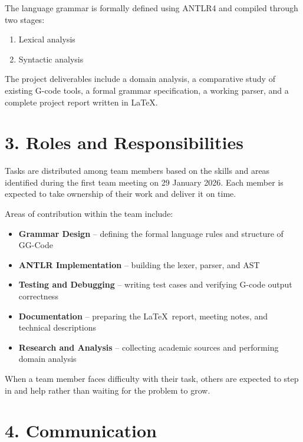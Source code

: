 \documentclass[12pt, a4paper]{article}
\begin{document}
The language grammar is formally defined using ANTLR4 and compiled through two stages:

\begin{enumerate}[leftmargin=2em]
    \item Lexical analysis
    \item Syntactic analysis
\end{enumerate}

The project deliverables include a domain analysis, a comparative study of existing G-code tools,
a formal grammar specification, a working parser, and a complete project report written in \LaTeX.

\section{3. Roles and Responsibilities}

Tasks are distributed among team members based on the skills and areas identified during the
first team meeting on 29 January 2026. Each member is expected to take ownership of their work
and deliver it on time.

Areas of contribution within the team include:

\begin{itemize}[leftmargin=2em, label={--}]
    \item \textbf{Grammar Design} -- defining the formal language rules and structure of GG-Code
    \item \textbf{ANTLR Implementation} -- building the lexer, parser, and AST
    \item \textbf{Testing and Debugging} -- writing test cases and verifying G-code output correctness
    \item \textbf{Documentation} -- preparing the \LaTeX\ report, meeting notes, and technical descriptions
    \item \textbf{Research and Analysis} -- collecting academic sources and performing domain analysis
\end{itemize}

When a team member faces difficulty with their task, others are expected to step in and help
rather than waiting for the problem to grow.

\section{4. Communication}
\end{document}
